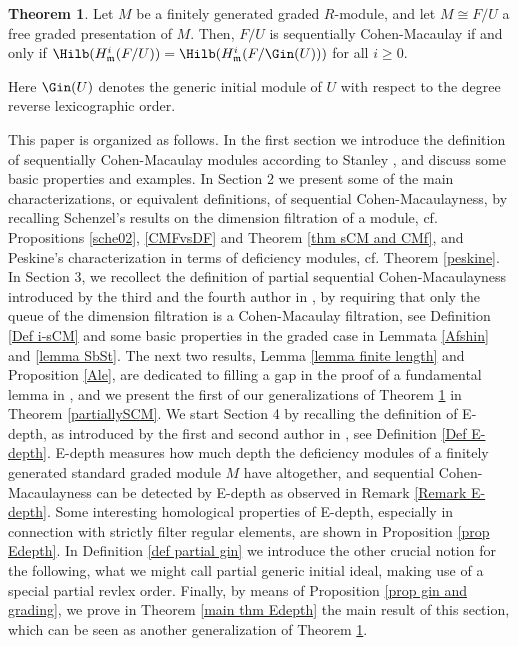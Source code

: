\documentclass[12pt]{amsart}
\theoremstyle{definition}
\newtheorem{Theorem}{Theorem}
\theoremstyle{definition}
\def\frk{\mathfrak}               %
\def\mm{{\frk m}}
\renewcommand{\geq}{\geqslant}
\begin{document}
\begin{Theorem} \label{HS Intro}
Let $M$ be a finitely generated graded $R$-module, and let $M \cong F/U$ a free graded presentation of $M$. Then, $F/U$ is sequentially Cohen-Macaulay  if and only if $\Hilb(H^i_{\mm}(F/U))=\Hilb(H^i_{\mm}(F/\Gin(U)))$ for all $i \geq 0$. 
\end{Theorem}
\noindent
Here $\Gin(U)$ denotes the generic initial module of $U$ with respect to the degree reverse lexicographic order.

\smallskip 

This paper is organized as follows. In the first section we introduce the definition of sequentially Cohen-Macaulay modules according to Stanley \cite{St96}, and discuss some basic properties and examples. In Section 2 we present some of the main characterizations, or equivalent definitions, of sequential Cohen-Macaulayness, by recalling Schenzel's results on the dimension filtration of a module, cf. Propositions \ref{sche02}, \ref{CMFvsDF} and Theorem \ref{thm sCM and CMf},  and Peskine's characterization in terms of deficiency modules, cf. Theorem \ref{peskine}. In Section 3, we recollect the definition of partial sequential Cohen-Macaulayness introduced by the third and the fourth author in \cite{SS17}, by requiring that only the queue of the dimension filtration is a Cohen-Macaulay filtration, see Definition \ref{Def i-sCM} and some basic properties in the graded case in Lemmata \ref{Afshin} and \ref{lemma SbSt}. The next two results, Lemma \ref{lemma finite length} and Proposition \ref{Ale}, are dedicated to filling a gap in the proof of a fundamental lemma in \cite{SS17}, and we present the first of our generalizations of Theorem \ref{HS Intro} in Theorem \ref{partiallySCM}. We start Section 4 by recalling the definition of E-depth, as introduced by the first and second author in \cite{CD21}, see Definition \ref{Def E-depth}. E-depth measures how much depth the deficiency modules of a finitely generated standard graded module $M$ have altogether, and sequential Cohen-Macaulayness can be detected by E-depth as observed in Remark \ref{Remark E-depth}. Some interesting homological properties of E-depth, especially in connection with strictly filter regular elements, are shown in Proposition \ref{prop Edepth}. In Definition \ref{def partial gin} we introduce the other crucial notion for the following, what we might call partial generic initial ideal, making use of a special partial revlex order. Finally, by means of Proposition \ref{prop gin and grading}, we prove in Theorem \ref{main thm Edepth} the main result of this section, which can be seen as another generalization of Theorem \ref{HS Intro}.
\end{document}
